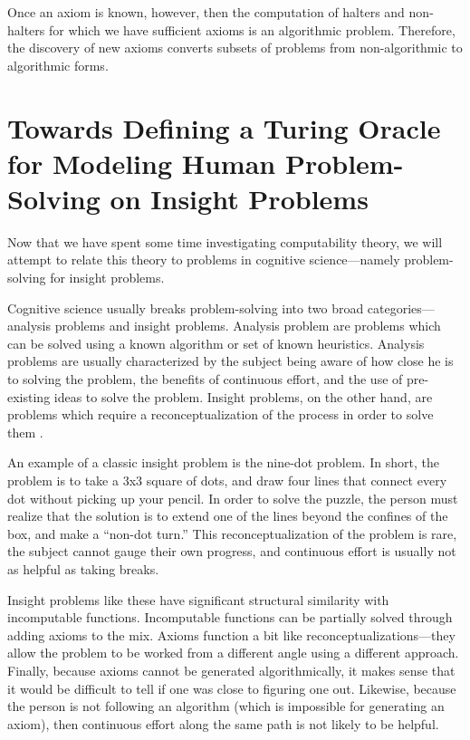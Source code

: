 Once an axiom is known, however, then the computation of halters and non-halters for which we have sufficient axioms is an algorithmic problem.  Therefore, the discovery of new axioms converts subsets of problems from non-algorithmic to algorithmic forms.

\section{Towards Defining a Turing Oracle for Modeling Human Problem-Solving on Insight Problems}

Now that we have spent some time investigating computability theory, we will attempt to relate this theory to problems in cognitive science---namely problem-solving for insight problems.

Cognitive science usually breaks problem-solving into two broad categories---analysis problems and insight problems.  Analysis problem are problems which can be solved using a known algorithm or set of known heuristics.  Analysis problems are usually characterized by the subject being aware of how close he is to solving the problem, the benefits of continuous effort, and the use of pre-existing ideas to solve the problem.  Insight problems, on the other hand, are problems which require a reconceptualization of the process in order to solve them \cite{chronicleetal2004}. 

An example of a classic insight problem is the nine-dot problem.  In short, the problem is to take a 3x3 square of dots, and draw four lines that connect every dot without picking up your pencil.  In order to solve the puzzle, the person must realize that the solution is to extend one of the lines beyond the confines of the box, and make a ``non-dot turn.''  This reconceptualization of the problem is rare, the subject cannot gauge their own progress, and continuous effort is usually not as helpful as taking breaks.

Insight problems like these have significant structural similarity with incomputable functions.  Incomputable functions can be partially solved through adding axioms to the mix.  Axioms function a bit like reconceptualizations---they allow the problem to be worked from a different angle using a different approach.  Finally, because axioms cannot be generated algorithmically, it makes sense that it would be difficult to tell if one was close to figuring one out.  Likewise, because the person is not following an algorithm (which is impossible for generating an axiom), then continuous effort along the same path is not likely to be helpful.

